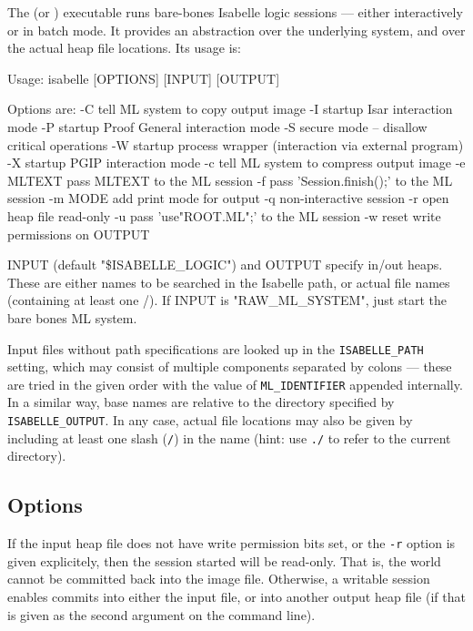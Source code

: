 The  (or ) executable runs
bare-bones Isabelle logic sessions --- either interactively or in batch mode.
It provides an abstraction over the underlying {\ML} system, and over the
actual heap file locations.  Its usage is:
\begin{ttbox}
Usage: isabelle [OPTIONS] [INPUT] [OUTPUT]

  Options are:
    -C           tell ML system to copy output image
    -I           startup Isar interaction mode
    -P           startup Proof General interaction mode
    -S           secure mode -- disallow critical operations
    -W           startup process wrapper (interaction via external program)
    -X           startup PGIP interaction mode
    -c           tell ML system to compress output image
    -e MLTEXT    pass MLTEXT to the ML session
    -f           pass 'Session.finish();' to the ML session
    -m MODE      add print mode for output
    -q           non-interactive session
    -r           open heap file read-only
    -u           pass 'use"ROOT.ML";' to the ML session
    -w           reset write permissions on OUTPUT

  INPUT (default "\$ISABELLE_LOGIC") and OUTPUT specify in/out heaps.
  These are either names to be searched in the Isabelle path, or
  actual file names (containing at least one /).
  If INPUT is "RAW_ML_SYSTEM", just start the bare bones ML system.
\end{ttbox}
Input files without path specifications are looked up in the
\texttt{ISABELLE_PATH} setting, which may consist of multiple components
separated by colons --- these are tried in the given order with the value of
\texttt{ML_IDENTIFIER} appended internally.  In a similar way, base names are
relative to the directory specified by \texttt{ISABELLE_OUTPUT}.  In any case,
actual file locations may also be given by including at least one slash
(\texttt{/}) in the name (hint: use \texttt{./} to refer to the current
directory).


\subsection*{Options}

If the input heap file does not have write permission bits set, or the
\texttt{-r} option is given explicitely, then the session started will be
read-only.  That is, the {\ML} world cannot be committed back into the image
file.  Otherwise, a writable session enables commits into either the input
file, or into another output heap file (if that is given as the second
argument on the command line).


